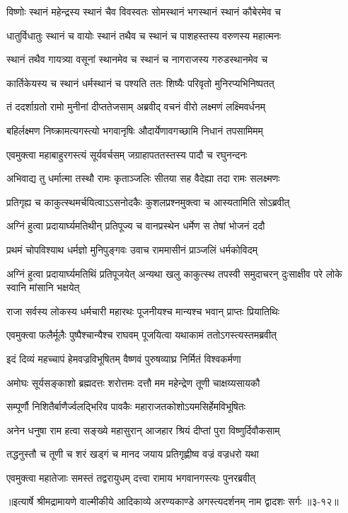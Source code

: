 \twolineshloka
{विष्णोः स्थानं महेन्द्रस्य स्थानं चैव विवस्वतः}
{सोमस्थानं भगस्थानं स्थानं कौबेरमेव च} %

\twolineshloka
{धातुर्विधातुः स्थानं च वायोः स्थानं तथैव च}
{स्थानं च पाशहस्तस्य वरुणस्य महात्मनः} %

\twolineshloka
{स्थानं तथैव गायत्र्या वसूनां स्थानमेव च}
{स्थानं च नागराजस्य गरुडस्थानमेव च} %

\twolineshloka
{कार्तिकेयस्य च स्थानं धर्मस्थानं च पश्यति}
{ततः शिष्यैः परिवृतो मुनिरप्यभिनिष्पतत्} %

\twolineshloka
{तं ददर्शाग्रतो रामो मुनीनां दीप्ततेजसाम्}
{अब्रवीद् वचनं वीरो लक्ष्मणं लक्ष्मिवर्धनम्} %

\twolineshloka
{बहिर्लक्ष्मण निष्क्रामत्यगस्त्यो भगवानृषिः}
{औदार्येणावगच्छामि निधानं तपसामिमम्} %

\twolineshloka
{एवमुक्त्वा महाबाहुरगस्त्यं सूर्यवर्चसम्}
{जग्राहापततस्तस्य पादौ च रघुनन्दनः} %

\twolineshloka
{अभिवाद्य तु धर्मात्मा तस्थौ रामः कृताञ्जलिः}
{सीतया सह वैदेह्या तदा रामः सलक्ष्मणः} %

\twolineshloka
{प्रतिगृह्य च काकुत्स्थमर्चयित्वाऽऽसनोदकैः}
{कुशलप्रश्नमुक्त्वा च आस्यतामिति सोऽब्रवीत्} %

\twolineshloka
{अग्निं हुत्वा प्रदायार्घ्यमतिथीन् प्रतिपूज्य च}
{वानप्रस्थेन धर्मेण स तेषां भोजनं ददौ} %

\twolineshloka
{प्रथमं चोपविश्याथ धर्मज्ञो मुनिपुङ्गवः}
{उवाच राममासीनं प्राञ्जलिं धर्मकोविदम्} %

\threelineshloka
{अग्निं हुत्वा प्रदायार्घ्यमतिथिं प्रतिपूजयेत्}
{अन्यथा खलु काकुत्स्थ तपस्वी समुदाचरन्}
{दुःसाक्षीव परे लोके स्वानि मांसानि भक्षयेत्} %

\twolineshloka
{राजा सर्वस्य लोकस्य धर्मचारी महारथः}
{पूजनीयश्च मान्यश्च भवान् प्राप्तः प्रियातिथिः} %

\twolineshloka
{एवमुक्त्वा फलैर्मूलैः पुष्पैश्चान्यैश्च राघवम्}
{पूजयित्वा यथाकामं ततोऽगस्त्यस्तमब्रवीत्} %

\twolineshloka
{इदं दिव्यं महच्चापं हेमवज्रविभूषितम्}
{वैष्णवं पुरुषव्याघ्र निर्मितं विश्वकर्मणा} %

\twolineshloka
{अमोघः सूर्यसङ्काशो ब्रह्मदत्तः शरोत्तमः}
{दत्तौ मम महेन्द्रेण तूणी चाक्षय्यसायकौ} %

\twolineshloka
{सम्पूर्णौ निशितैर्बाणैर्ज्वलद्भिरिव पावकैः}
{महाराजतकोशोऽयमसिर्हेमविभूषितः} %

\twolineshloka
{अनेन धनुषा राम हत्वा सङ्ख्ये महासुरान्}
{आजहार श्रियं दीप्तां पुरा विष्णुर्दिवौकसाम्} %

\twolineshloka
{तद्धनुस्तौ च तूणी च शरं खड्गं च मानद}
{जयाय प्रतिगृह्णीष्व वज्रं वज्रधरो यथा} %

\twolineshloka
{एवमुक्त्वा महातेजाः समस्तं तद्वरायुधम्}
{दत्त्वा रामाय भगवानगस्त्यः पुनरब्रवीत्} %


॥इत्यार्षे श्रीमद्रामायणे वाल्मीकीये आदिकाव्ये अरण्यकाण्डे अगस्त्यदर्शनम् नाम द्वादशः सर्गः ॥३-१२॥
